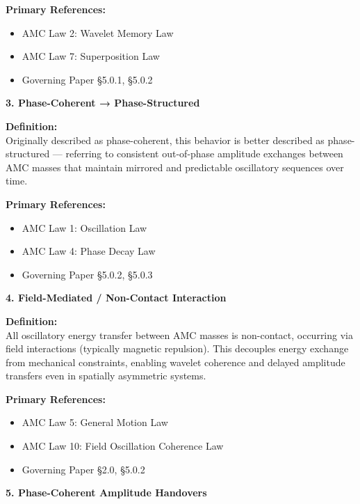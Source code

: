 \documentclass[10pt,aps,pre,onecolumn,superscriptaddress,notitlepage]{revtex4-2}
\begin{document}
\textbf{Primary References:}
\begin{itemize}[leftmargin=1.5em]
  \item AMC Law 2: Wavelet Memory Law
  \item AMC Law 7: Superposition Law
  \item Governing Paper §5.0.1, §5.0.2
\end{itemize}

\vspace{1em}

\noindent\textbf{3. Phase-Coherent → Phase-Structured}

\textbf{Definition:} \\
Originally described as phase-coherent, this behavior is better described as phase-structured — referring to consistent out-of-phase amplitude exchanges between AMC masses that maintain mirrored and predictable oscillatory sequences over time.

\textbf{Primary References:}
\begin{itemize}[leftmargin=1.5em]
  \item AMC Law 1: Oscillation Law
  \item AMC Law 4: Phase Decay Law
  \item Governing Paper §5.0.2, §5.0.3
\end{itemize}

\vspace{1em}

\noindent\textbf{4. Field-Mediated / Non-Contact Interaction}

\textbf{Definition:} \\
All oscillatory energy transfer between AMC masses is non-contact, occurring via field interactions (typically magnetic repulsion). This decouples energy exchange from mechanical constraints, enabling wavelet coherence and delayed amplitude transfers even in spatially asymmetric systems.

\textbf{Primary References:}
\begin{itemize}[leftmargin=1.5em]
  \item AMC Law 5: General Motion Law
  \item AMC Law 10: Field Oscillation Coherence Law
  \item Governing Paper §2.0, §5.0.2
\end{itemize}

\vspace{1em}

\noindent\textbf{5. Phase-Coherent Amplitude Handovers}
\end{document}

